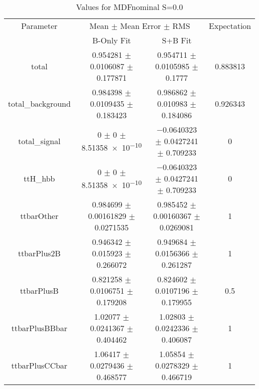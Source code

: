 \begin{table}
\centering
\caption{Values for MDFnominal S=0.0}
\begin{tabular}{cccc}
\toprule
Parameter & \multicolumn{2}{c}{Mean $\pm$ Mean Error $\pm$ RMS} & Expectation\\
 & B-Only Fit & S+B Fit & \\
\midrule
total & \num{0.954281} $\pm$ \num{0.0106087} $\pm$ \num{0.177871} & \num{0.954711} $\pm$ \num{0.0105985} $\pm$ \num{0.1777} & \num{0.883813}\\
total\_background & \num{0.984398} $\pm$ \num{0.0109435} $\pm$ \num{0.183423} & \num{0.986862} $\pm$ \num{0.010983} $\pm$ \num{0.184086} & \num{0.926343}\\
total\_signal & \num{0} $\pm$ \num{0} $\pm$ \num{8.51358e-10} & \num{-0.0640323} $\pm$ \num{0.0427241} $\pm$ \num{0.709233} & \num{0}\\
ttH\_hbb & \num{0} $\pm$ \num{0} $\pm$ \num{8.51358e-10} & \num{-0.0640323} $\pm$ \num{0.0427241} $\pm$ \num{0.709233} & \num{0}\\
ttbarOther & \num{0.984699} $\pm$ \num{0.00161829} $\pm$ \num{0.0271535} & \num{0.985452} $\pm$ \num{0.00160367} $\pm$ \num{0.0269081} & \num{1}\\
ttbarPlus2B & \num{0.946342} $\pm$ \num{0.015923} $\pm$ \num{0.266072} & \num{0.949684} $\pm$ \num{0.0156366} $\pm$ \num{0.261287} & \num{1}\\
ttbarPlusB & \num{0.821258} $\pm$ \num{0.0106751} $\pm$ \num{0.179208} & \num{0.824602} $\pm$ \num{0.0107196} $\pm$ \num{0.179955} & \num{0.5}\\
ttbarPlusBBbar & \num{1.02077} $\pm$ \num{0.0241367} $\pm$ \num{0.404462} & \num{1.02803} $\pm$ \num{0.0242336} $\pm$ \num{0.406087} & \num{1}\\
ttbarPlusCCbar & \num{1.06417} $\pm$ \num{0.0279436} $\pm$ \num{0.468577} & \num{1.05854} $\pm$ \num{0.0278329} $\pm$ \num{0.466719} & \num{1}\\
\bottomrule
\end{tabular}
\end{table}